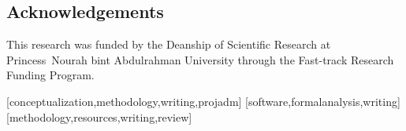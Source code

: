 \documentclass[french]{textolivre}
\begin{document}
\begin{english}
\section*{Acknowledgements} This research was funded by the Deanship of Scientific Research at Princess Nourah bint Abdulrahman University through the Fast-track Research Funding Program.
\end{english}

\printbibliography\label{sec-bib}


\begin{contributors}
[conceptualization,methodology,writing,projadm]
[software,formalanalysis,writing]
[methodology,resources,writing,review]
\end{contributors}
\end{document}
